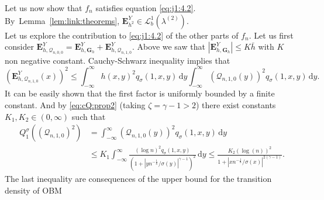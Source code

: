 \documentclass[12pt]{article}
\numberwithin{equation}{section}
\theoremstyle{definition}
\theoremstyle{remark}
\newcommand{\RR}{\mathbb{R}}
\newcommand{\cQ}{\mathcal{Q}}
\newcommand{\vd}{\,\mathrm{d}}
\newcommand{\Lgb}[1]{\mathcal{L}^{1}_{b}(\lambda^{(#1)})}
\newcommand{\bfH}[1]{\mathbf{E}^Y_{#1}}
\newcommand{\bfG}[1]{\mathbf{G}_{#1}}
\begin{document}
Let us now show that $f_n$ satisfies equation \eqref{eq:j1:4.2}.
By~Lemma~\ref{lem:link:theorems},
$\bfH {h^2} \in \Lgb{2}$. 
%
\\
Let us explore the contribution to \eqref{eq:j1:4.2} of the other parts of $f_n$. 
%
Let us first consider 
$
	\bfH{h, \cQ_{n,0,0}}= \bfH{h, \bfG{h}}+\bfH{h, \cQ_{n,1,0}}.
$
Above we saw that $|\bfH{h, \bfG{h}}|\leq K\bar h$ with $K$ non negative constant. %
Cauchy-Schwarz inequality implies that
\begin{equation}
	( \bfH{h, \cQ_{n,1,0}}(x) )^2
	\leq  \int_{-\infty}^\infty h(x,y)^2 q_\sigma (1,x,y) \vd y \int_{-\infty}^\infty  (\cQ_{n,1,0}(y))^2 q_\sigma (1,x,y) \vd y.
\end{equation}
It can be easily shown that the first factor is uniformly bounded by a finite constant.
And by \eqref{eq:cQ:prop2} (taking $\zeta = \gamma-1>2$) there exist constants $K_1,K_2\in (0,\infty)$ 
such that
\begin{equation} \label{eq:recicle} 
	\begin{split}
	Q^\sigma_1 \left(  (\cQ_{n,1,0})^2 \right) & = \int_{-\infty}^{\infty} (\cQ_{n,1,0}(y))^2 q_\sigma (1,x,y) \vd y
	\\
	& \leq  K_1
	 \int_{-\infty}^{\infty}   \frac{(\log n)^2  q_\sigma (1,x,y)}{(1+|y n^{-\frac18}/\sigma(y)|^{\gamma-1})^2}  \vd y
	\leq  \frac{ K_2 (\log (n))^2}{1+|x n^{-\frac18}/\sigma(x)|^{2(\gamma-1)}}.
\end{split}
\end{equation}
The last inequality are consequences of the upper bound for the transition density of OBM
\end{document}
